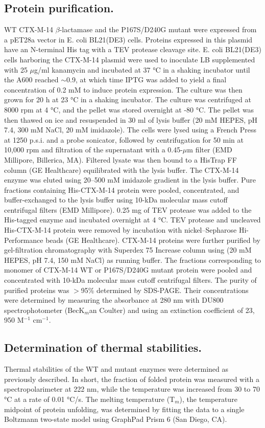 \documentclass[../main.tex]{subfiles}
\begin{document}
    \subsection{Protein purification.}
        WT CTX-M-14 $\beta$-lactamase and the P167S/D240G mutant were expressed from a pET28a vector in E. coli BL21(DE3) cells. Proteins expressed in this plasmid have an N-terminal His tag with a TEV protease cleavage site. E. coli BL21(DE3) cells harboring the CTX-M-14 plasmid were used to inoculate LB supplemented with 25 $\mu$g/ml kanamycin and incubated at 37 °C in a shaking incubator until the A600 reached $\sim$0.9, at which time IPTG was added to yield a final concentration of 0.2 mM to induce protein expression. The culture was then grown for 20 h at 23 °C in a shaking incubator. The culture was centrifuged at 8000 rpm at 4 °C, and the pellet was stored overnight at -80 °C. The pellet was then thawed on ice and resuspended in 30 ml of lysis buffer (20 mM HEPES, pH 7.4, 300 mM NaCl, 20 mM imidazole). The cells were lysed using a French Press at 1250 p.s.i. and a probe sonicator, followed by centrifugation for 50 min at 10,000 rpm and filtration of the supernatant with a 0.45-$\mu$m filter (EMD Millipore, Billerica, MA). Filtered lysate was then bound to a HisTrap FF column (GE Healthcare) equilibrated with the lysis buffer. The CTX-M-14 enzyme was eluted using 20–500 mM imidazole gradient in the lysis buffer. Pure fractions containing His-CTX-M-14 protein were pooled, concentrated, and buffer-exchanged to the lysis buffer using 10-kDa molecular mass cutoff centrifugal filters (EMD Millipore). 0.25 mg of TEV protease was added to the His-tagged enzyme and incubated overnight at 4 °C. TEV protease and uncleaved His-CTX-M-14 protein were removed by incubation with nickel–Sepharose Hi-Performance beads (GE Healthcare). CTX-M-14 proteins were further purified by gel-filtration chromatography with Superdex 75 Increase column using (20 mM HEPES, pH 7.4, 150 mM NaCl) as running buffer. The fractions corresponding to monomer of CTX-M-14 WT or P167S/D240G mutant protein were pooled and concentrated with 10-kDa molecular mass cutoff centrifugal filters. The purity of purified proteins was $>$95\% determined by SDS-PAGE. Their concentrations were determined by measuring the absorbance at 280 nm with DU800 spectrophotometer (BecK$_{m}$an Coulter) and using an extinction coefficient of 23, 950 M$^{-1}$ cm$^{-1}$.

    \subsection{Determination of thermal stabilities.}
        Thermal stabilities of the WT and mutant enzymes were determined as previously described\cite{patel_characterization_2015}. In short, the fraction of folded protein was measured with a spectropolarimeter at 222 nm, while the temperature was increased from 30 to 70 °C at a rate of 0.01 °C/s. The melting temperature (T$_{m}$), the temperature midpoint of protein unfolding, was determined by fitting the data to a single Boltzmann two-state model using GraphPad Prism 6 (San Diego, CA)\cite{brown_multiple_2010}.
\end{document}
